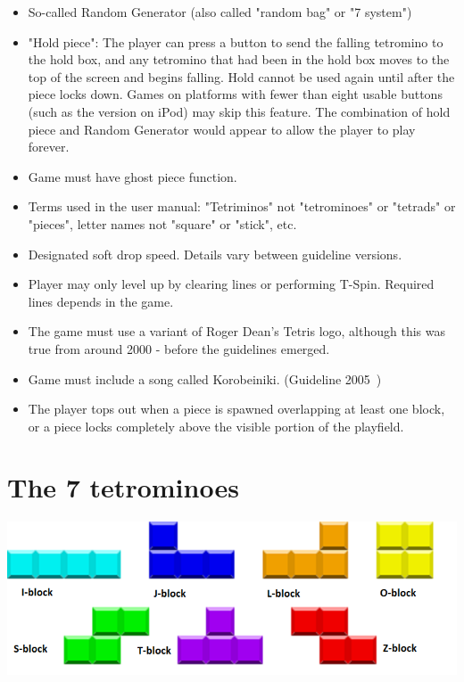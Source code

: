 \documentclass[a4paper]{article}
\begin{document}
\begin{itemize}
	\item So-called Random Generator (also called "random bag" or "7 system")
	
	\item "Hold piece": The player can press a button to send the falling tetromino to the hold box, and any tetromino that had been in the hold box moves to the top of the screen and begins falling. Hold cannot be used again until after the piece locks down. Games on platforms with fewer than eight usable buttons (such as the version on iPod) may skip this feature. The combination of hold piece and Random Generator would appear to allow the player to play forever.
	
	\item Game must have ghost piece function.
	
	\item Terms used in the user manual: "Tetriminos" not "tetrominoes" or "tetrads" or "pieces", letter names not "square" or "stick", etc.
	
	\item Designated soft drop speed. Details vary between guideline versions.
	
	\item Player may only level up by clearing lines or performing T-Spin. Required lines depends in the game.
	
	\item The game must use a variant of Roger Dean's Tetris logo, although this was true from around 2000 - before the guidelines emerged.
	
	\item Game must include a song called Korobeiniki. (Guideline 2005~)
	
	\item The player tops out when a piece is spawned overlapping at least one block, or a piece locks completely above the visible portion of the playfield.
	
\end{itemize}


\section{The 7 tetrominoes}

	\parbox[]{0.8\textwidth}{
	\centering
	\includegraphics[scale=0.5]{resources/img/tetrominoes}
	\label{tetrominoes}
	}
\end{document}
